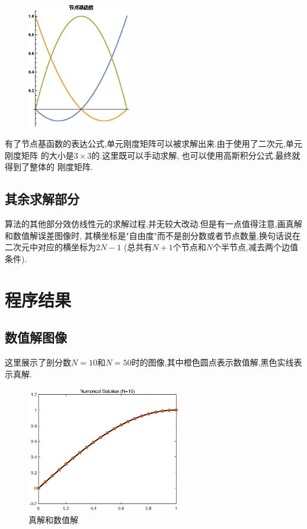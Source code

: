 \documentclass[11pt,reqno]{article}
\numberwithin{equation}{section}
\begin{document}
\begin{figure}[h]
	\centering
	\includegraphics[width=0.4\textwidth]{Basisfunction.eps}

\end{figure}

有了节点基函数的表达公式,单元刚度矩阵可以被求解出来.由于使用了二次元,单元刚度矩阵
的大小是$3\times3$的.这里既可以手动求解, 也可以使用高斯积分公式.最终就得到了整体的
刚度矩阵.

\subsection{其余求解部分}

算法的其他部分效仿线性元的求解过程,并无较大改动.但是有一点值得注意,画真解和数值解误差图像时,
其横坐标是"自由度"而不是剖分数或者节点数量,换句话说在二次元中对应的横坐标为$2N-1$
(总共有$N+1$个节点和$N$个半节点,减去两个边值条件).


\section{程序结果}
\subsection{数值解图像}
这里展示了剖分数$N=10$和$N=50$时的图像,其中橙色圆点表示数值解,黑色实线表示真解. 
\\[-20pt]
\begin{figure}[h]
	\centering
	  \includegraphics[width=0.6\textwidth]{N=10.eps}
	  \caption{真解和数值解}
\end{figure}
\end{document}
